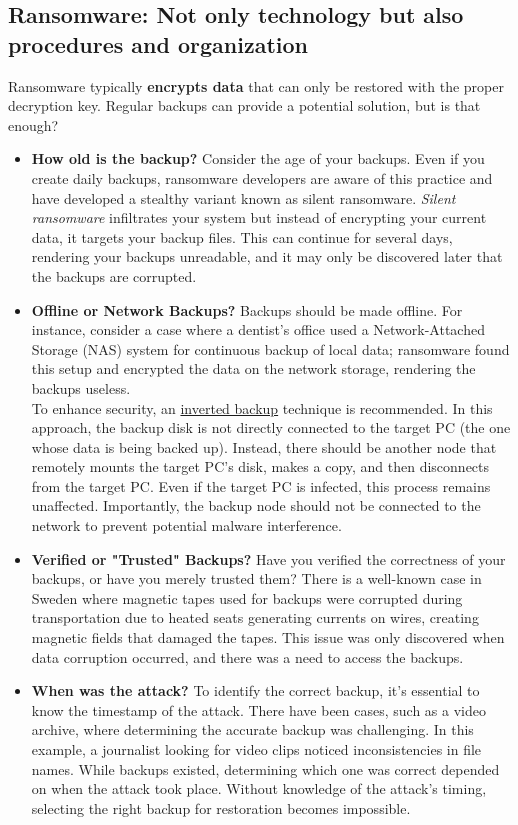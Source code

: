 \subsection{Ransomware: Not only technology but also procedures and organization}
Ransomware typically \textbf{encrypts data} that can only be restored with the proper decryption key. Regular backups can provide a potential solution, but is that enough?
\begin{itemize}
	\item \textbf{How old is the backup?} Consider the age of your backups. Even if you create daily backups, ransomware developers are aware of this practice and have developed a stealthy variant known as silent ransomware. \emph{Silent ransomware} infiltrates your system but instead of encrypting your current data, it targets your backup files. This can continue for several days, rendering your backups unreadable, and it may only be discovered later that the backups are corrupted.
	\item \textbf{Offline or Network Backups?} Backups should be made offline. For instance, consider a case where a dentist's office used a Network-Attached Storage (NAS) system for continuous backup of local data; ransomware found this setup and encrypted the data on the network storage, rendering the backups useless.\\
	      To enhance security, an \ul{inverted backup} technique is recommended. In this approach, the backup disk is not directly connected to the target PC (the one whose data is being backed up). Instead, there should be another node that remotely mounts the target PC's disk, makes a copy, and then disconnects from the target PC. Even if the target PC is infected, this process remains unaffected. Importantly, the backup node should not be connected to the network to prevent potential malware interference.
	\item \textbf{Verified or "Trusted" Backups?} Have you verified the correctness of your backups, or have you merely trusted them? There is a well-known case in Sweden where magnetic tapes used for backups were corrupted during transportation due to heated seats generating currents on wires, creating magnetic fields that damaged the tapes. This issue was only discovered when data corruption occurred, and there was a need to access the backups.
	\item \textbf{When was the attack?} To identify the correct backup, it's essential to know the timestamp of the attack. There have been cases, such as a video archive, where determining the accurate backup was challenging. In this example, a journalist looking for video clips noticed inconsistencies in file names. While backups existed, determining which one was correct depended on when the attack took place. Without knowledge of the attack's timing, selecting the right backup for restoration becomes impossible.
\end{itemize}



